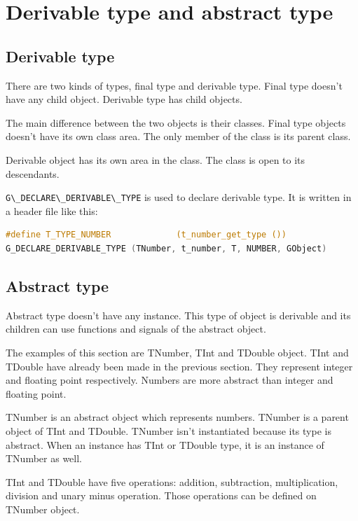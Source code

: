 \section{Derivable type and abstract
type}\label{derivable-type-and-abstract-type}

\subsection{Derivable type}\label{derivable-type}

There are two kinds of types, final type and derivable type. Final type
doesn't have any child object. Derivable type has child objects.

The main difference between the two objects is their classes. Final type
objects doesn't have its own class area. The only member of the class is
its parent class.

Derivable object has its own area in the class. The class is open to its
descendants.

\passthrough{\lstinline!G\_DECLARE\_DERIVABLE\_TYPE!} is used to declare
derivable type. It is written in a header file like this:

\begin{lstlisting}[language=C]
#define T_TYPE_NUMBER             (t_number_get_type ())
G_DECLARE_DERIVABLE_TYPE (TNumber, t_number, T, NUMBER, GObject)
\end{lstlisting}

\subsection{Abstract type}\label{abstract-type}

Abstract type doesn't have any instance. This type of object is
derivable and its children can use functions and signals of the abstract
object.

The examples of this section are TNumber, TInt and TDouble object. TInt
and TDouble have already been made in the previous section. They
represent integer and floating point respectively. Numbers are more
abstract than integer and floating point.

TNumber is an abstract object which represents numbers. TNumber is a
parent object of TInt and TDouble. TNumber isn't instantiated because
its type is abstract. When an instance has TInt or TDouble type, it is
an instance of TNumber as well.

TInt and TDouble have five operations: addition, subtraction,
multiplication, division and unary minus operation. Those operations can
be defined on TNumber object.

